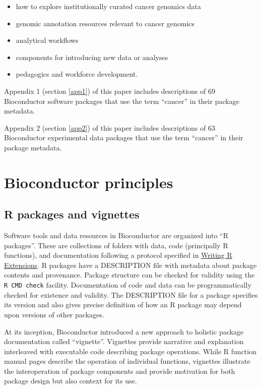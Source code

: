 \begin{itemize}
\tightlist
\item
  how to explore institutionally curated cancer genomics data
\item
  genomic annotation resources relevant to cancer genomics
\item
  analytical workflows
\item
  components for introducing new data or analyses
\item
  pedagogics and workforce development.
\end{itemize}


Appendix 1 (section \ref{app1}) of this paper includes descriptions of 69
Bioconductor software packages that use the term ``cancer'' in their package metadata.

Appendix 2 (section \ref{app2}) of this paper includes descriptions of 63
Bioconductor experimental data packages that use the term ``cancer'' in their package metadata.

\hypertarget{bioconductor-principles}{%
\section{Bioconductor principles}\label{bioconductor-principles}}

\hypertarget{r-packages-and-vignettes}{%
\subsection{R packages and vignettes}\label{r-packages-and-vignettes}}

Software tools and data resources in Bioconductor are organized
into ``R packages''. These are collections of folders with data,
code (principally R functions), and documentation
following a protocol specified in
\href{https://cran.r-project.org/doc/manuals/R-exts.html}{Writing R Extensions}. R packages have a DESCRIPTION file with metadata about
package contents and provenance. Package structure can be
checked for validity using the \texttt{R CMD check} facility.
Documentation of code and data can be programmatically
checked for existence and validity. The DESCRIPTION file
for a package specifies its version and
also gives precise definition of how an R package may
depend upon versions of other packages.

At its inception,
Bioconductor introduced a new approach to holistic package
documentation called ``vignette''.
Vignettes provide narrative and explanation interleaved with
executable code describing package operations.
While R function manual pages describe
the operation of individual functions,
vignettes illustrate the interoperation
of package components and provide motivation
for both package design but also context
for its use.

